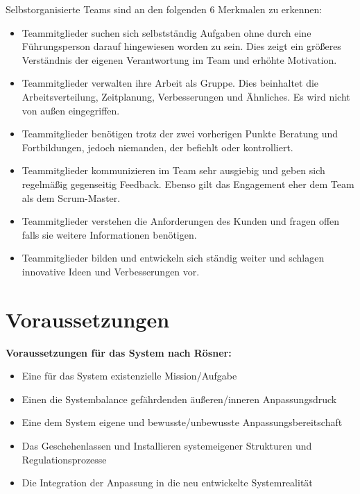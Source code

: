 Selbstorganisierte Teams sind an den folgenden 6 Merkmalen zu erkennen:\cite{Mittal2013}
\begin{itemize}
    \item Teammitglieder suchen sich selbstständig Aufgaben ohne durch eine Führungsperson darauf hingewiesen worden zu sein. Dies zeigt ein größeres Verständnis der eigenen Verantwortung im Team und erhöhte Motivation.
    \item Teammitglieder verwalten ihre Arbeit als Gruppe. Dies beinhaltet die Arbeitsverteilung, Zeitplanung, Verbesserungen und Ähnliches. Es wird nicht von außen eingegriffen.
    \item Teammitglieder benötigen trotz der zwei vorherigen Punkte Beratung und Fortbildungen, jedoch niemanden, der befiehlt oder kontrolliert.
	\item Teammitglieder kommunizieren im Team sehr ausgiebig und geben sich regelmäßig gegenseitig Feedback. Ebenso gilt das Engagement eher dem Team als dem Scrum-Master.
	\item Teammitglieder verstehen die Anforderungen des Kunden und fragen offen falls sie weitere Informationen benötigen.
    \item Teammitglieder bilden und entwickeln sich ständig weiter und schlagen innovative Ideen und Verbesserungen vor.
\end{itemize}


\section{Voraussetzungen}

\textbf{Voraussetzungen für das System nach Rösner:}\cite{Gloger2014}
\begin{itemize}
	\item Eine für das System existenzielle Mission/Aufgabe
	\item Einen die Systembalance gefährdenden äußeren/inneren Anpassungsdruck
	\item Eine dem System eigene und bewusste/unbewusste Anpassungsbereitschaft
	\item Das Geschehenlassen und Installieren systemeigener Strukturen und Regulationsprozesse
	\item Die Integration der Anpassung in die neu entwickelte Systemrealität
\end{itemize}

